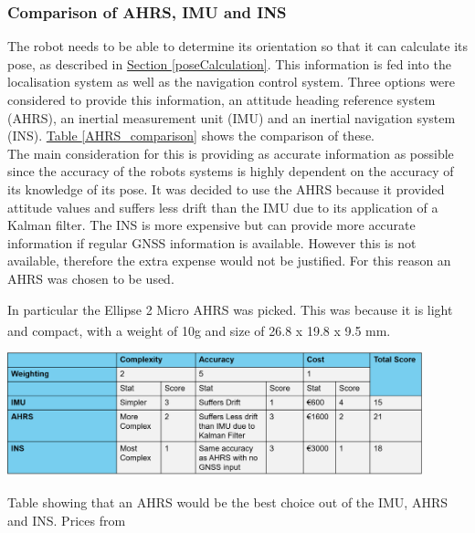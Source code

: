 \documentclass[11pt]{article}		%
\newcommand{\supercite}[1]{\textsuperscript{\cite{#1}}}		%
\newcommand{\tableref}[1]{\hyperref[#1]{Table \ref*{#1}}}     %
\newcommand{\sectref}[1]{\hyperref[#1]{Section \ref*{#1}}}     %
\begin{document}
            \subsubsection{Comparison of AHRS, IMU and INS}
            
            The robot needs to be able to determine its orientation so that it can calculate its pose, as described in \sectref{poseCalculation}.
            This information is fed into the localisation system as well as the navigation control system. 
            Three options were considered to provide this information, an attitude heading reference system (AHRS), an inertial measurement unit (IMU) and an inertial navigation system (INS). \tableref{AHRS_comparison} shows the comparison of these.
            \\
            The main consideration for this is providing as accurate information as possible since the accuracy of the robots systems is highly dependent on the accuracy of its knowledge of its pose. 
            It was decided to use the AHRS because it provided attitude values and suffers less drift than the IMU due to its application of a Kalman filter. 
            The INS is more expensive but can provide more accurate information if regular GNSS information is available. 
            However this is not available, therefore the extra expense would not be justified. For this reason an AHRS was chosen to be used.
            
            In particular the Ellipse 2 Micro AHRS was picked.
            This was because it is light and compact, with a weight of 10g and size of 26.8 x 19.8 x 9.5 mm. \supercite{Ellipse_Ahrs}
            \\
            
            
            \begin{table}[h]
					\centering
					\includegraphics[width=0.9\textwidth]{IMU_formatted_table}
					\caption{Table showing that an AHRS would be the best choice out of the IMU, AHRS and INS. Prices from \cite{Ellipse_Ahrs}}
					\label{AHRS_comparison}
				\end{table}
				
\end{document}

